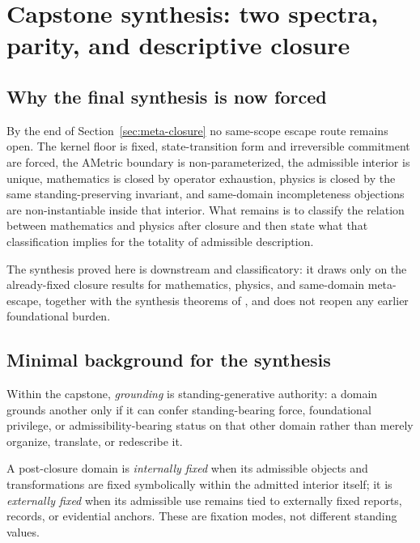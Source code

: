 \section{Capstone synthesis: two spectra, parity, and descriptive closure}
\label{sec:capstone-synthesis}

\subsection{Why the final synthesis is now forced}

By the end of Section~\ref{sec:meta-closure} no same-scope escape route remains open. The kernel floor is fixed, state-transition form and irreversible commitment are forced, the AMetric boundary is non-parameterized, the admissible interior is unique, mathematics is closed by operator exhaustion, physics is closed by the same standing-preserving invariant, and same-domain incompleteness objections are non-instantiable inside that interior. What remains is to classify the relation between mathematics and physics after closure and then state what that classification implies for the totality of admissible description.

The synthesis proved here is downstream and classificatory: it draws only on the already-fixed closure results for mathematics, physics, and same-domain meta-escape, together with the synthesis theorems of \eademdoc{}, and does not reopen any earlier foundational burden.\cite{MaleyEadem,MaleyClausura,MaleyFoundationalClosure,MaleyAMetric}

\subsection{Minimal background for the synthesis}

\begin{definition}[Grounding]
Within the capstone, \emph{grounding} is standing-generative authority: a domain grounds another only if it can confer standing-bearing force, foundational privilege, or admissibility-bearing status on that other domain rather than merely organize, translate, or redescribe it.
\end{definition}

\begin{definition}
A post-closure domain is \emph{internally fixed} when its admissible objects and transformations are fixed symbolically within the admitted interior itself; it is \emph{externally fixed} when its admissible use remains tied to externally fixed reports, records, or evidential anchors. These are fixation modes, not different standing values.
\end{definition}

